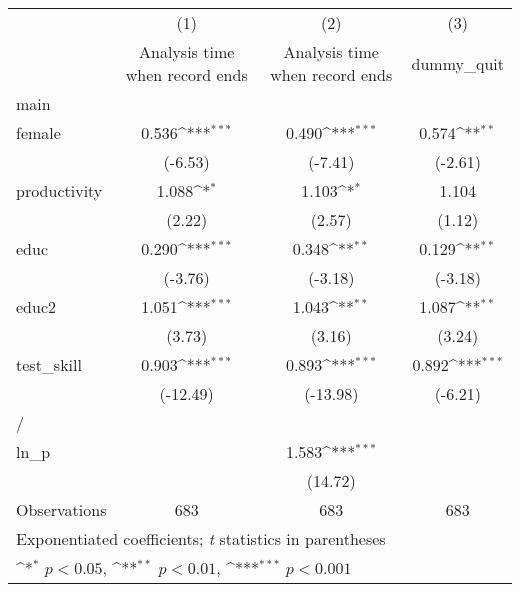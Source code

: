 {
\def\sym#1{\ifmmode^{#1}\else\(^{#1}\)\fi}
\begin{tabular}{l*{3}{c}}
\hline\hline
                    &\multicolumn{1}{c}{(1)}&\multicolumn{1}{c}{(2)}&\multicolumn{1}{c}{(3)}\\
                    &\multicolumn{1}{c}{Analysis time when record ends}&\multicolumn{1}{c}{Analysis time when record ends}&\multicolumn{1}{c}{dummy\_quit}\\
\hline
main                &                     &                     &                     \\
female              &       0.536\sym{***}&       0.490\sym{***}&       0.574\sym{**} \\
                    &     (-6.53)         &     (-7.41)         &     (-2.61)         \\
[1em]
productivity        &       1.088\sym{*}  &       1.103\sym{*}  &       1.104         \\
                    &      (2.22)         &      (2.57)         &      (1.12)         \\
[1em]
educ                &       0.290\sym{***}&       0.348\sym{**} &       0.129\sym{**} \\
                    &     (-3.76)         &     (-3.18)         &     (-3.18)         \\
[1em]
educ2               &       1.051\sym{***}&       1.043\sym{**} &       1.087\sym{**} \\
                    &      (3.73)         &      (3.16)         &      (3.24)         \\
[1em]
test\_skill          &       0.903\sym{***}&       0.893\sym{***}&       0.892\sym{***}\\
                    &    (-12.49)         &    (-13.98)         &     (-6.21)         \\
\hline
/                   &                     &                     &                     \\
ln\_p                &                     &       1.583\sym{***}&                     \\
                    &                     &     (14.72)         &                     \\
\hline
Observations        &         683         &         683         &         683         \\
\hline\hline
\multicolumn{4}{l}{\footnotesize Exponentiated coefficients; \textit{t} statistics in parentheses}\\
\multicolumn{4}{l}{\footnotesize \sym{*} \(p<0.05\), \sym{**} \(p<0.01\), \sym{***} \(p<0.001\)}\\
\end{tabular}
}
